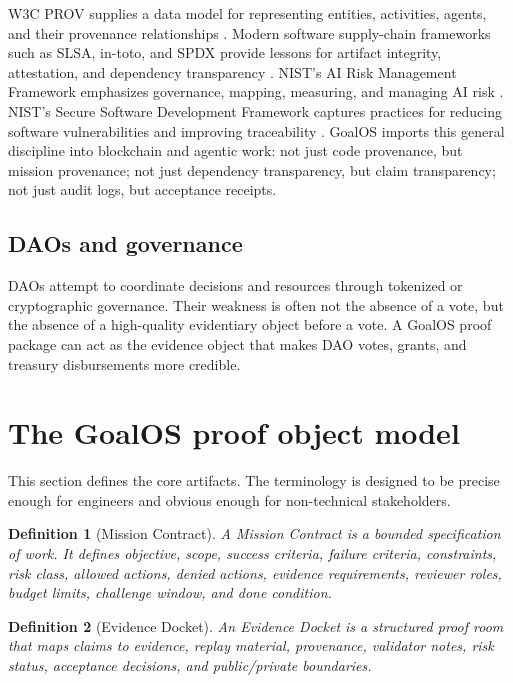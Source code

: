 \documentclass[11pt]{article}
\newtheorem{definition}{Definition}[section]
\begin{document}
W3C PROV supplies a data model for representing entities, activities, agents, and their provenance relationships \citep{w3cProv}. Modern software supply-chain frameworks such as SLSA, in-toto, and SPDX provide lessons for artifact integrity, attestation, and dependency transparency \citep{slsa,inToto,spdx}. NIST's AI Risk Management Framework emphasizes governance, mapping, measuring, and managing AI risk \citep{nistAirmf}. NIST's Secure Software Development Framework captures practices for reducing software vulnerabilities and improving traceability \citep{nistSSDF}. GoalOS imports this general discipline into blockchain and agentic work: not just code provenance, but mission provenance; not just dependency transparency, but claim transparency; not just audit logs, but acceptance receipts.

\subsection{DAOs and governance}

DAOs attempt to coordinate decisions and resources through tokenized or cryptographic governance. Their weakness is often not the absence of a vote, but the absence of a high-quality evidentiary object before a vote. A GoalOS proof package can act as the evidence object that makes DAO votes, grants, and treasury disbursements more credible.

\section{The GoalOS proof object model}

This section defines the core artifacts. The terminology is designed to be precise enough for engineers and obvious enough for non-technical stakeholders.

\begin{definition}[Mission Contract]
A \emph{Mission Contract} is a bounded specification of work. It defines objective, scope, success criteria, failure criteria, constraints, risk class, allowed actions, denied actions, evidence requirements, reviewer roles, budget limits, challenge window, and done condition.
\end{definition}

\begin{definition}[Evidence Docket]
An \emph{Evidence Docket} is a structured proof room that maps claims to evidence, replay material, provenance, validator notes, risk status, acceptance decisions, and public/private boundaries.
\end{definition}
\end{document}
